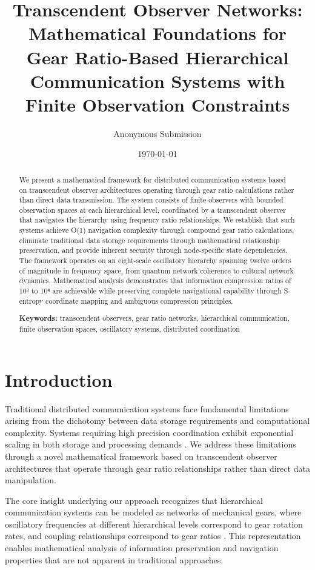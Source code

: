 \documentclass[12pt,a4paper]{article}
\title{Transcendent Observer Networks: Mathematical Foundations for Gear Ratio-Based Hierarchical Communication Systems with Finite Observation Constraints}
\author{
Anonymous Submission
}
\date{\today}
\begin{document}
\maketitle

\begin{abstract}
We present a mathematical framework for distributed communication systems based on transcendent observer architectures operating through gear ratio calculations rather than direct data transmission. The system consists of finite observers with bounded observation spaces at each hierarchical level, coordinated by a transcendent observer that navigates the hierarchy using frequency ratio relationships. We establish that such systems achieve O(1) navigation complexity through compound gear ratio calculations, eliminate traditional data storage requirements through mathematical relationship preservation, and provide inherent security through node-specific state dependencies. The framework operates on an eight-scale oscillatory hierarchy spanning twelve orders of magnitude in frequency space, from quantum network coherence to cultural network dynamics. Mathematical analysis demonstrates that information compression ratios of 10² to 10⁴ are achievable while preserving complete navigational capability through S-entropy coordinate mapping and ambiguous compression principles.

\textbf{Keywords:} transcendent observers, gear ratio networks, hierarchical communication, finite observation spaces, oscillatory systems, distributed coordination
\end{abstract}

\section{Introduction}

Traditional distributed communication systems face fundamental limitations arising from the dichotomy between data storage requirements and computational complexity. Systems requiring high precision coordination exhibit exponential scaling in both storage and processing demands \cite{lamport1978time, mills1991internet}. We address these limitations through a novel mathematical framework based on transcendent observer architectures that operate through gear ratio relationships rather than direct data manipulation.

The core insight underlying our approach recognizes that hierarchical communication systems can be modeled as networks of mechanical gears, where oscillatory frequencies at different hierarchical levels correspond to gear rotation rates, and coupling relationships correspond to gear ratios \cite{goldstein2002classical}. This representation enables mathematical analysis of information preservation and navigation properties that are not apparent in traditional approaches.
\end{document}

